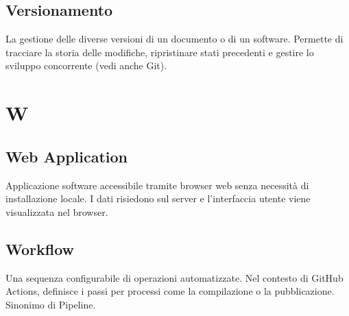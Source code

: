 \documentclass[a4paper, 11pt, oneside]{scrartcl} %
\begin{document}
\vspace{0.5cm}

\subsection*{Versionamento}
La gestione delle diverse versioni di un documento o di un software. Permette di tracciare la storia delle modifiche, ripristinare stati precedenti e gestire lo sviluppo concorrente (vedi anche Git).
\vspace{0.5cm}



\section*{W}


\subsection*{Web Application}


Applicazione software accessibile tramite browser web senza necessità di installazione locale. I dati risiedono sul server e l'interfaccia utente viene visualizzata nel browser.

\vspace{0.5cm}

\subsection*{Workflow}


Una sequenza configurabile di operazioni automatizzate. Nel contesto di GitHub Actions, definisce i passi per processi come la compilazione o la pubblicazione. Sinonimo di Pipeline.

\vspace{0.5cm}
\end{document}
